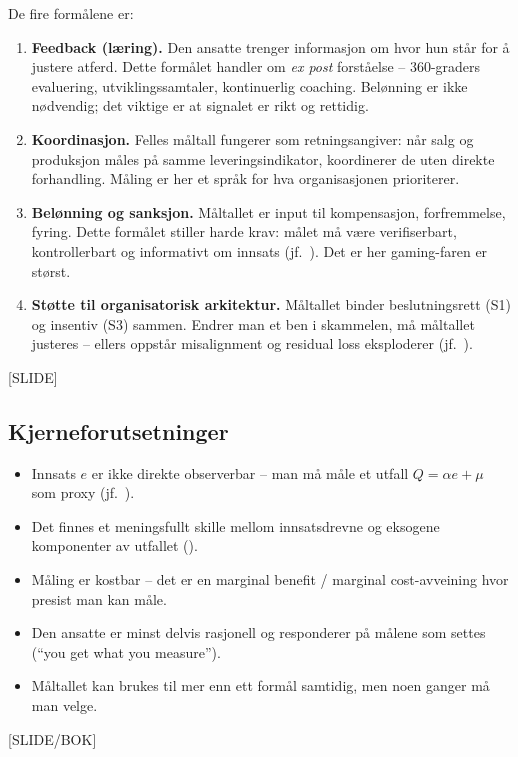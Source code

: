 De fire formålene er:
\begin{enumerate}\setlength{\itemsep}{3pt}
\item \textbf{Feedback (læring).} Den ansatte trenger informasjon om hvor hun står for å justere atferd. Dette formålet handler om \emph{ex post} forståelse -- 360-graders evaluering, utviklingssamtaler, kontinuerlig coaching. Belønning er ikke nødvendig; det viktige er at signalet er rikt og rettidig.
\item \textbf{Koordinasjon.} Felles måltall fungerer som retningsangiver: når salg og produksjon måles på samme leveringsindikator, koordinerer de uten direkte forhandling. Måling er her et språk for hva organisasjonen prioriterer.
\item \textbf{Belønning og sanksjon.} Måltallet er input til kompensasjon, forfremmelse, fyring. Dette formålet stiller harde krav: målet må være verifiserbart, kontrollerbart og informativt om innsats (jf.\ ). Det er her gaming-faren er størst.
\item \textbf{Støtte til organisatorisk arkitektur.} Måltallet binder beslutningsrett (S1) og insentiv (S3) sammen. Endrer man et ben i skammelen, må måltallet justeres -- ellers oppstår misalignment og residual loss eksploderer (jf.\ ).
\end{enumerate}
[SLIDE]

\subsection*{Kjerneforutsetninger}
\begin{itemize}
\item Innsats $e$ er ikke direkte observerbar -- man må måle et utfall $Q = \alpha e + \mu$ som proxy (jf.\ ).
\item Det finnes et meningsfullt skille mellom innsatsdrevne og eksogene komponenter av utfallet ().
\item Måling er kostbar -- det er en marginal benefit / marginal cost-avveining hvor presist man kan måle.
\item Den ansatte er minst delvis rasjonell og responderer på målene som settes (``you get what you measure'').
\item Måltallet kan brukes til mer enn ett formål samtidig, men noen ganger må man velge.
\end{itemize}
[SLIDE/BOK]

